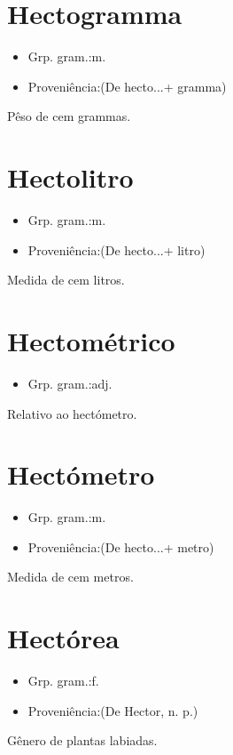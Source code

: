 \documentclass{article}
\begin{document}
\section{Hectogramma}
\begin{itemize}
\item {Grp. gram.:m.}
\end{itemize}
\begin{itemize}
\item {Proveniência:(De \textunderscore hecto...\textunderscore  + \textunderscore gramma\textunderscore )}
\end{itemize}
Pêso de cem grammas.
\section{Hectolitro}
\begin{itemize}
\item {Grp. gram.:m.}
\end{itemize}
\begin{itemize}
\item {Proveniência:(De \textunderscore hecto...\textunderscore  + \textunderscore litro\textunderscore )}
\end{itemize}
Medida de cem litros.
\section{Hectométrico}
\begin{itemize}
\item {Grp. gram.:adj.}
\end{itemize}
Relativo ao hectómetro.
\section{Hectómetro}
\begin{itemize}
\item {Grp. gram.:m.}
\end{itemize}
\begin{itemize}
\item {Proveniência:(De \textunderscore hecto...\textunderscore  + \textunderscore metro\textunderscore )}
\end{itemize}
Medida de cem metros.
\section{Hectórea}
\begin{itemize}
\item {Grp. gram.:f.}
\end{itemize}
\begin{itemize}
\item {Proveniência:(De \textunderscore Hector\textunderscore , n. p.)}
\end{itemize}
Gênero de plantas labiadas.
\end{document}
